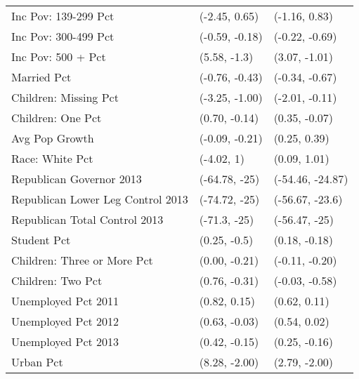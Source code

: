 \begin{table}[ht]
\begin{tabular}{lll}
  Inc Pov: 139-299 Pct & (-2.45, 0.65) & (-1.16, 0.83) \\ 
  Inc Pov: 300-499 Pct & (-0.59, -0.18) & (-0.22, -0.69) \\ 
  Inc Pov: 500 + Pct & (5.58, -1.3) & (3.07, -1.01) \\ 
  Married Pct & (-0.76, -0.43) & (-0.34, -0.67) \\ 
  Children: Missing Pct & (-3.25, -1.00) & (-2.01, -0.11) \\ 
  Children: One Pct & (0.70, -0.14) & (0.35, -0.07) \\ 
  Avg Pop Growth & (-0.09, -0.21) & (0.25, 0.39) \\ 
  Race: White Pct & (-4.02, 1) & (0.09, 1.01) \\ 
  Republican Governor 2013 & (-64.78, -25) & (-54.46, -24.87) \\ 
  Republican Lower Leg Control 2013 & (-74.72, -25) & (-56.67, -23.6) \\ 
  Republican Total Control 2013 & (-71.3, -25) & (-56.47, -25) \\ 
  Student Pct & (0.25, -0.5) & (0.18, -0.18) \\ 
  Children: Three or More Pct & (0.00, -0.21) & (-0.11, -0.20) \\ 
  Children: Two Pct & (0.76, -0.31) & (-0.03, -0.58) \\ 
  Unemployed Pct 2011 & (0.82, 0.15) & (0.62, 0.11) \\ 
  Unemployed Pct 2012 & (0.63, -0.03) & (0.54, 0.02) \\ 
  Unemployed Pct 2013 & (0.42, -0.15) & (0.25, -0.16) \\ 
  Urban Pct & (8.28, -2.00) & (2.79, -2.00) \\ 
   \hline
\end{tabular}
\end{table}
